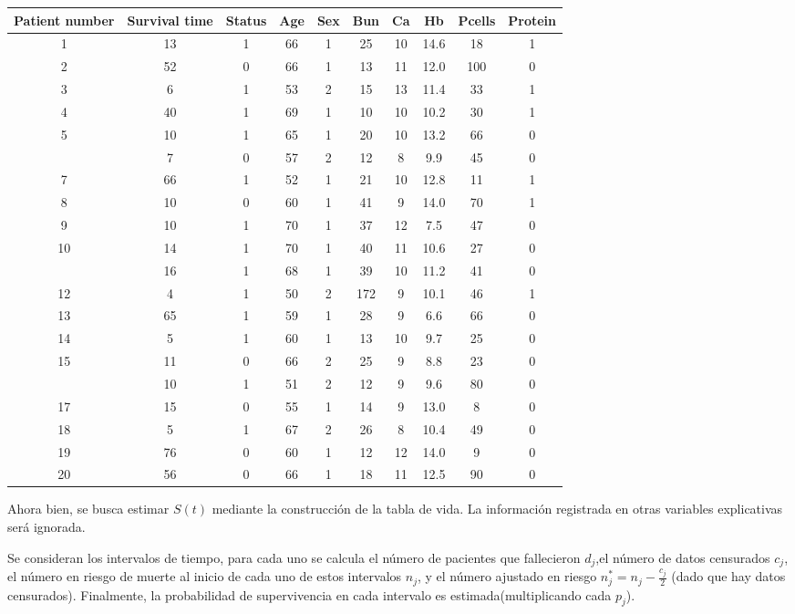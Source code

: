 \documentclass[
  a4paper,
  oneside,
  openany]{book}
\begin{document}
\begin{table}
\centering
\begin{tabular}{cccccccccc}
\toprule
Patient
number & Survival
time & Status & Age & Sex & Bun & Ca & Hb & Pcells & Protein\\
\midrule
1 & 13 & 1 & 66 & 1 & 25 & 10 & 14.6 & 18 & 1\\
2 & 52 & 0 & 66 & 1 & 13 & 11 & 12.0 & 100 & 0\\
3 & 6 & 1 & 53 & 2 & 15 & 13 & 11.4 & 33 & 1\\
4 & 40 & 1 & 69 & 1 & 10 & 10 & 10.2 & 30 & 1\\
5 & 10 & 1 & 65 & 1 & 20 & 10 & 13.2 & 66 & 0\\
\addlinespace
6 & 7 & 0 & 57 & 2 & 12 & 8 & 9.9 & 45 & 0\\
7 & 66 & 1 & 52 & 1 & 21 & 10 & 12.8 & 11 & 1\\
8 & 10 & 0 & 60 & 1 & 41 & 9 & 14.0 & 70 & 1\\
9 & 10 & 1 & 70 & 1 & 37 & 12 & 7.5 & 47 & 0\\
10 & 14 & 1 & 70 & 1 & 40 & 11 & 10.6 & 27 & 0\\
\addlinespace
11 & 16 & 1 & 68 & 1 & 39 & 10 & 11.2 & 41 & 0\\
12 & 4 & 1 & 50 & 2 & 172 & 9 & 10.1 & 46 & 1\\
13 & 65 & 1 & 59 & 1 & 28 & 9 & 6.6 & 66 & 0\\
14 & 5 & 1 & 60 & 1 & 13 & 10 & 9.7 & 25 & 0\\
15 & 11 & 0 & 66 & 2 & 25 & 9 & 8.8 & 23 & 0\\
\addlinespace
16 & 10 & 1 & 51 & 2 & 12 & 9 & 9.6 & 80 & 0\\
17 & 15 & 0 & 55 & 1 & 14 & 9 & 13.0 & 8 & 0\\
18 & 5 & 1 & 67 & 2 & 26 & 8 & 10.4 & 49 & 0\\
19 & 76 & 0 & 60 & 1 & 12 & 12 & 14.0 & 9 & 0\\
20 & 56 & 0 & 66 & 1 & 18 & 11 & 12.5 & 90 & 0\\
\bottomrule
\end{tabular}
\end{table}

Ahora bien, se busca estimar \(S(t)\) mediante la construcción de la tabla de vida. La información registrada en otras variables explicativas será ignorada.

Se consideran los intervalos de tiempo, para cada uno se calcula el número de pacientes que fallecieron \(d_{j}\),el número de datos censurados \(c_{j}\), el número en riesgo de muerte al inicio de cada uno de estos intervalos \(n_{j}\), y el número ajustado en riesgo \(n_{j}^{*}=n_{j}-\frac{c_{j}}{2}\) (dado que hay datos censurados). Finalmente, la probabilidad de supervivencia en cada intervalo es estimada(multiplicando cada \(p_j\)).
\end{document}
